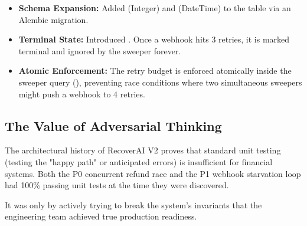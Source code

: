 \begin{tcolorbox}[featurebox={Schema \& Logic Updates (Batch 5.3.1)}]
\begin{itemize}
    \item \textbf{Schema Expansion:} Added  (Integer) and  (DateTime) to the  table via an Alembic migration.
    \item \textbf{Terminal State:} Introduced . Once a webhook hits 3 retries, it is marked terminal and ignored by the sweeper forever.
    \item \textbf{Atomic Enforcement:} The retry budget is enforced atomically inside the sweeper query (), preventing race conditions where two simultaneous sweepers might push a webhook to 4 retries.
\end{itemize}
\end{tcolorbox}

\vspace{0.8cm}

\subsection{The Value of Adversarial Thinking}

The architectural history of RecoverAI V2 proves that standard unit testing (testing the "happy path" or anticipated errors) is insufficient for financial systems. Both the P0 concurrent refund race and the P1 webhook starvation loop had 100\% passing unit tests at the time they were discovered. 

It was only by actively trying to break the system's invariants that the engineering team achieved true production readiness.
